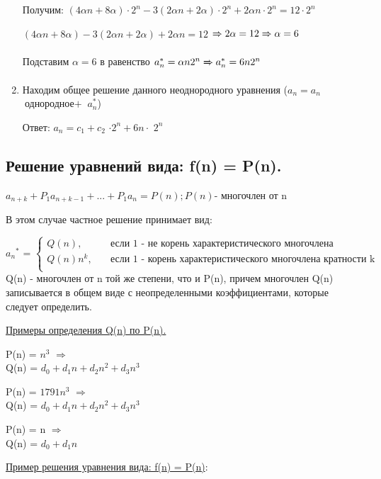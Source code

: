 \documentclass[12pt, a4paper, oneside]{article}
\theoremstyle{plain} %
\theoremstyle{definition}
\begin{document}
\begin{enumerate}
    Получим: $(4 \alpha n +8 \alpha)\cdot 2^n - 3(2 \alpha n + 2 \alpha) \cdot 2^n + 2 \alpha n \cdot  2^n = 12 \cdot  2^n    $
    
    $(4 \alpha n +8 \alpha) - 3(2 \alpha n + 2 \alpha)  + 2 \alpha n  = 12  $ $ \xRightarrow[]{} 2 \alpha = 12 \xRightarrow[]{} \alpha = 6$
    
    
    Подставим $\alpha = 6$ в равенство $a_n^* = \alpha  n 2^n  \xRightarrow[]{}  a_n^* = 6  n 2^n $
    
    \item Находим общее решение данного неоднородного уравнения ($a_n = a_n$ $\text{однородное} +$ $a_n^*$)
    
    Ответ: $a_n = c_1 + c_2$ $\cdot 2^n + 6 n \cdot$ $2^n$
 
\end{enumerate}



\subsection{Решение уравнений вида: f(n) = P(n).}

$a_{n+k}+P_1  a_{n+k-1}+ ... + P_1 a_{n} = P(n);P(n)$- многочлен от n

В этом случае  частное решение принимает вид:

\[ \textbf{${a_n}^*$ = }
    \begin{cases}
        Q(n), &\quad\text{если 1 - не корень характеристического многочлена}\\
        
        Q(n) n ^ k  ,  &\quad\text{если  1  -  корень характеристического многочлена кратности k}\\
    \end{cases}
\]  
    Q(n) - многочлен от n той же степени, что и P(n), причем многочлен Q(n) записывается в общем виде с неопределенными коэффициентами, которые следует определить.

\underline{Примеры определения Q(n) по P(n).}

P(n) = $n^3$ \( \Longrightarrow \) \\Q(n) = $d_0 + d_1 n + d_2 n^2 + d_3 n^3 $

P(n) = $1791  n^3$ \( \Longrightarrow \) \\Q(n) = $d_0 + d_1 n + d_2 n^2 + d_3 n^3 $

P(n) = n  \( \Longrightarrow \) \\Q(n) = $d_0 + d_1 n$

\underline{Пример решения уравнения вида: f(n) = P(n)}:
\end{document}
